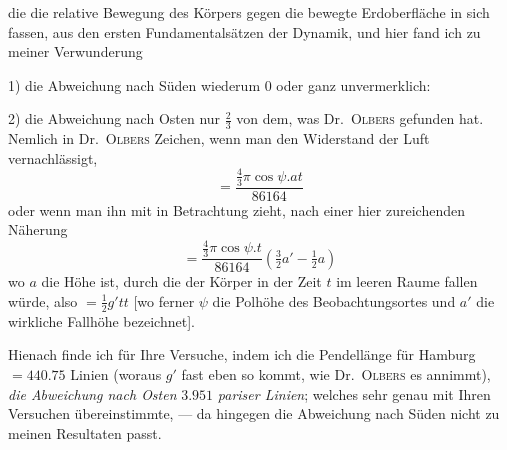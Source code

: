 \par\clearpage
{}
\noindent die die relative Bewegung des Körpers gegen die bewegte Erdoberfläche in sich fassen, aus den ersten Fundamentalsätzen der Dynamik, und hier fand ich zu meiner Verwunderung

1) die Abweichung nach Süden wiederum $0$ oder ganz unvermerklich:

2) die Abweichung nach Osten nur $\tfrac23$ von dem, was Dr.\ \textsc{Olbers} gefunden hat. Nemlich in Dr.\ \textsc{Olbers} Zeichen, wenn man den Widerstand der Luft vernachlässigt,
\[
=\frac{\tfrac43\pi\cos\psi.at}{86164}
\]
oder wenn man ihn mit in Betrachtung zieht, nach einer hier zureichenden Näherung
\[
=\frac{\tfrac43\pi\cos\psi.t}{86164}(\tfrac32a'-\tfrac12a)
\]
wo $a$ die Höhe ist, durch die der Körper in der Zeit $t$ im leeren Raume fallen würde, also $=\tfrac12g'tt$ [wo ferner $\psi$ die Polhöhe des Beobachtungsortes und $a'$ die wirkliche Fallhöhe bezeichnet].

Hienach finde ich für Ihre Versuche, indem ich die Pendellänge für Hamburg $=440.75$ Linien (woraus $g'$ fast eben so kommt, wie Dr.\ \textsc{Olbers} es annimmt), \textit{die Abweichung nach Osten} $3.951$ \textit{pariser Linien}; welches sehr genau mit Ihren Versuchen übereinstimmte, — da hingegen die Abweichung nach Süden nicht zu meinen Resultaten passt.

